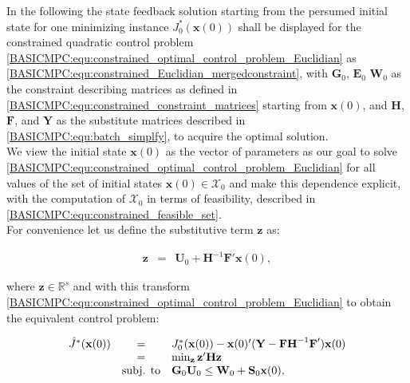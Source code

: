     In the following the state feedback solution starting from the persumed initial state for one minimizing instance $J^*_0(\textbf{x}(0))$ shall be displayed for the constrained quadratic control problem \ref{BASICMPC:equ:constrained_optimal_control_problem_Euclidian} as \ref{BASICMPC:equ:constrained_Euclidian_mergedconstraint}, with $\textbf{G}_0$, $\textbf{E}_0$ $\textbf{W}_0$ as the constraint describing matrices as defined in \ref{BASICMPC:equ:constrained_constraint_matrices} starting from $\textbf{x}(0)$, and $\textbf{H}$, $\textbf{F}$, and $\textbf{Y}$ as the substitute matrices described in \ref{BASICMPC:equ:batch_simplfy}, to acquire the optimal solution.\\
    We view the initial state $\textbf{x}(0)$ as the vector of parameters as our goal to solve \ref{BASICMPC:equ:constrained_optimal_control_problem_Euclidian} for all values of the set of initial states $\textbf{x}(0)\in\mathcal{X}_0$ and make this dependence explicit, with the computation of $\mathcal{X}_0$ in terms of feasibility, described in  \ref{BASICMPC:equ:constrained_feasible_set}.\\
    For convenience let us define the substitutive term $\textbf{z}$ as:
    
    \begin{equation}
    \begin{array}{rcl}
            \textbf{z}&=&\textbf{U}_0+\textbf{H}^{-1}\textbf{F}'\textbf{x}(0),
        \end{array}
        \label{BASICMPC:equ:constrained_substitute_z}
    \end{equation}

    where $\textbf{z}\in\mathbb{R}^s$ and with this transform \ref{BASICMPC:equ:constrained_optimal_control_problem_Euclidian} to obtain the equivalent control problem:
    
    \begin{equation}
    \begin{array}{rcl}
            \hat{J}^*(\textbf{x}(0))&=&J^*_0(\textbf{x}(0))-\textbf{x}(0)'(\textbf{Y}-\textbf{F}\textbf{H}^{-1}\textbf{F}')\textbf{x}(0)\\
            &=&\min_{\textbf{z}}\textbf{z}'\textbf{H}\textbf{z}\\
            &\textnormal{subj. to}&\textbf{G}_0\textbf{U}_0\leq\textbf{W}_0+\textbf{S}_0\textbf{x}(0),
        \end{array}
        \label{BASICMPC:equ:constrained_substitute_J}
    \end{equation}
    
